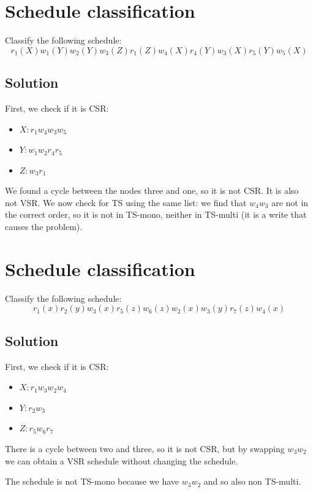 \documentclass[12pt, a4paper]{report}
\begin{document}
    \newpage

    \section{Schedule classification}
        Classify the following schedule:
        \[r_1(X) w_1(Y) w_2(Y) w_3(Z) r_1(Z) w_4(X) r_4(Y) w_3(X) r_5(Y) w_5(X)\] 
    \subsection*{Solution}
        First, we check if it is CSR:
        \begin{itemize}
            \item $X: r_1 w_4 w_3 w_5$
            \item $Y: w_1 w_2 r_4 r_5$
            \item $Z: w_3 r_1$
        \end{itemize}
        We found a cycle between the nodes three and one, so it is not CSR. It is also not VSR. We now check for TS using the same list: 
        we find that $w_4 w_3$ are not in the correct order, so it is not in TS-mono, neither in TS-multi (it is a write that causes the 
        problem).

    \newpage

    \section{Schedule classification}
        Classify the following schedule:
        \[r_1(x) r_2(y) w_3(x) r_5(z) w_6(z) w_2(x) w_3(y) r_7(z) w_4(x)\] 
    \subsection*{Solution}
        First, we check if it is CSR:
        \begin{itemize}
            \item $X: r_1 w_3 w_2 w_4$
            \item $Y: r_2 w_3$
            \item $Z: r_5 w_6 r_7$
        \end{itemize}
        There is a cycle between two and three, so it is not CSR, but by swapping $w_3 w_2$ we can obtain a VSR schedule without changing the 
        schedule. 

        The schedule is not TS-mono because we have $w_3 w_2$ and so also non TS-multi. 
   
    \newpage 
\end{document}
